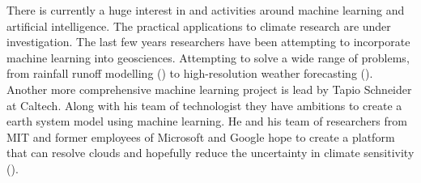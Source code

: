 There is currently a huge interest in and activities around machine learning and artificial intelligence.
The practical applications to climate research are under investigation. The last few years researchers have been attempting to incorporate machine learning into geosciences. Attempting to solve a wide range of problems, from rainfall runoff modelling (\cite{hess-23-5089-2019}) to  high-resolution weather forecasting (\cite{Rodrigues2018DeepDownscale:Forecast}).
Another more comprehensive machine learning project is lead by Tapio Schneider at Caltech. Along with his team of technologist they have ambitions to create a earth system model using machine learning. He and his team of researchers from MIT and former employees of Microsoft and Google hope to create a platform that can resolve clouds and hopefully reduce the uncertainty in climate sensitivity  (\cite{Voosen2018ScienceIntelligence}).




